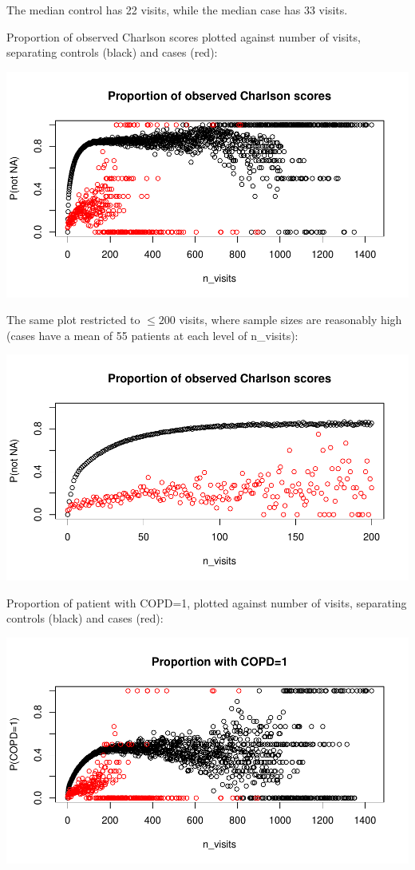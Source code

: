 \documentclass[12pt]{article}
\begin{document}
The median control has 22 visits, while the median case has 33 visits.

Proportion of observed Charlson scores plotted against number of visits, separating controls (black) and cases (red):

\begin{center}
\includegraphics[width=.6\textwidth]{nvisits_scatter.pdf}
\end{center}

The same plot restricted to $\leq 200$ visits, where sample sizes are reasonably high (cases have a mean of 55 patients at each level of n\_visits):

\begin{center}
\includegraphics[width=.6\textwidth]{nvisits_scatter200.pdf}
\end{center}

Proportion of patient with COPD=1, plotted against number of visits, separating controls (black) and cases (red):

\begin{center}
\includegraphics[width=.6\textwidth]{nvisits_scatterCOPD.pdf}
\end{center}
\end{document}
